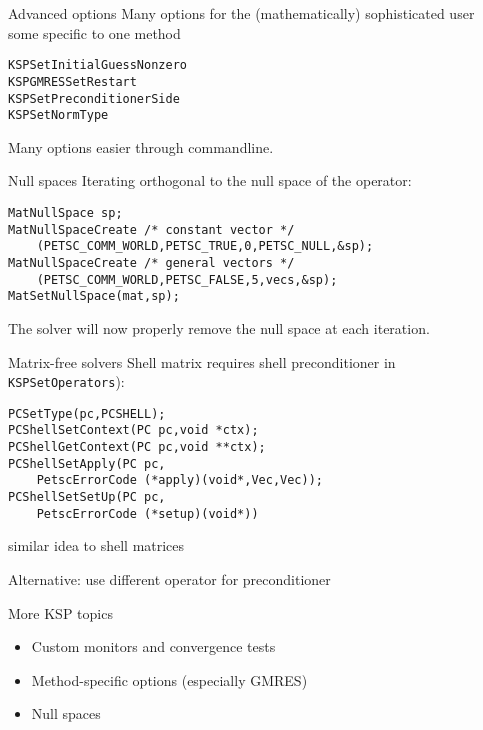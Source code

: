 \begin{numberedframe}{Advanced options}
Many options for the (mathematically) sophisticated user\\
some specific to one method
\begin{lstlisting}
KSPSetInitialGuessNonzero
KSPGMRESSetRestart
KSPSetPreconditionerSide
KSPSetNormType
\end{lstlisting}
Many options easier through commandline.
\end{numberedframe}

\begin{numberedframe}{Null spaces}
  Iterating orthogonal to the null space of the operator:
\begin{lstlisting}
MatNullSpace sp;
MatNullSpaceCreate /* constant vector */
    (PETSC_COMM_WORLD,PETSC_TRUE,0,PETSC_NULL,&sp);
MatNullSpaceCreate /* general vectors */
    (PETSC_COMM_WORLD,PETSC_FALSE,5,vecs,&sp);
MatSetNullSpace(mat,sp);
\end{lstlisting}

The solver will now properly remove the null space at each iteration.
\end{numberedframe}

\begin{numberedframe}{Matrix-free solvers}
Shell matrix requires shell preconditioner
in \lstinline{KSPSetOperators}):
\begin{lstlisting}
PCSetType(pc,PCSHELL);
PCShellSetContext(PC pc,void *ctx);
PCShellGetContext(PC pc,void **ctx);
PCShellSetApply(PC pc,
    PetscErrorCode (*apply)(void*,Vec,Vec));
PCShellSetSetUp(PC pc,
    PetscErrorCode (*setup)(void*))
\end{lstlisting}
similar idea to shell matrices

Alternative: use different operator for preconditioner
\end{numberedframe}

\begin{shortversion}

\begin{numberedframe}{More KSP topics}
  \begin{itemize}
  \item Custom monitors and convergence tests
  \item Method-specific options (especially GMRES)
  \item Null spaces
  \end{itemize}
\end{numberedframe}

\end{shortversion}

